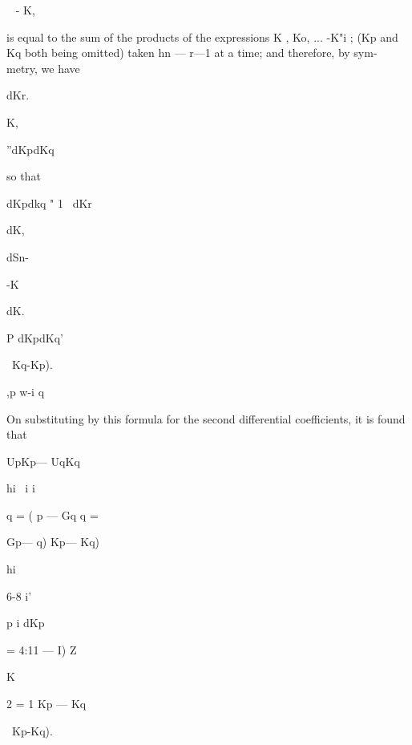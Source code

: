 {~ - K, 






is equal to the sum of the products of the expressions K , Ko, ... -K"i ; (Kp and 
Kq both being omitted) taken hn — r—1 at a time; and therefore, by sym- 
metry, we have 



dKr. 



K, 



''dKpdKq 



so that 



dKpdkq " 1 ~dKr 



dK, 

dSn- 



-K 



dK. 



P dKpdKq' 



\ Kq-Kp). 



,p w-i q 

On substituting by this formula for the second differential coefficients, it 
is found that 






UpKp— UqKq 



hi \ i i 

  q =  (  p — Gq q = \ \ {Gp— q) Kp— Kq)\  



hi 

6-8 i' 



p i dKp 



=  4:11 — I) Z 



K  



2 = 1 Kp — Kq\  









\ Kp-Kq). 



}}
